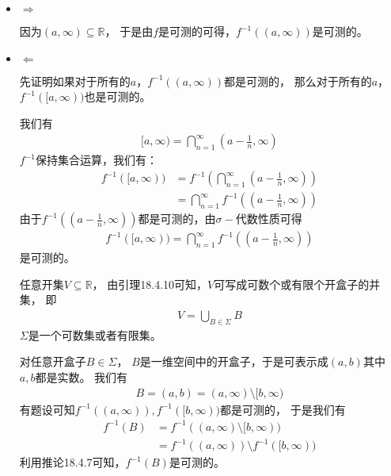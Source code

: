 \documentclass{article}
\begin{document}
\begin{itemize}
  \item $\Rightarrow$

        因为$(a, \infty) \subseteq \mathbb{R}$，
        于是由$f$是可测的可得，$f^{-1}((a, \infty))$是可测的。

  \item $\Leftarrow$

        先证明如果对于所有的$a$，$f^{-1}((a, \infty))$都是可测的，
        那么对于所有的$a$，$f^{-1}([a, \infty))$也是可测的。

        我们有
        \begin{align*}
          [a, \infty) = \bigcap\limits_{n = 1}^\infty (a - \frac{1}{n}, \infty)
        \end{align*}
        $f^{-1}$保持集合运算，我们有：
        \begin{align*}
          f^{-1}([a, \infty)) & = f^{-1}\left(\bigcap\limits_{n = 1}^\infty (a - \frac{1}{n}, \infty)\right) \\
                              & = \bigcap\limits_{n = 1}^\infty f^{-1}((a - \frac{1}{n}, \infty))
        \end{align*}
        由于$f^{-1}((a - \frac{1}{n}, \infty))$都是可测的，由$\sigma-$代数性质可得
        \begin{align*}
          f^{-1}([a, \infty)) = \bigcap\limits_{n = 1}^\infty f^{-1}((a - \frac{1}{n}, \infty))
        \end{align*}
        是可测的。

        任意开集$V \subseteq \mathbb{R}$，
        由引理18.4.10可知，$V$可写成可数个或有限个开盒子的并集，
        即
        \begin{align*}
          V = \bigcup_{B \in \Sigma} B
        \end{align*}
        $\Sigma$是一个可数集或者有限集。

        对任意开盒子$B \in \Sigma$，
        $B$是一维空间中的开盒子，于是可表示成$(a, b)$其中$a, b$都是实数。
        我们有
        \begin{align*}
          B = (a, b) = (a, \infty) \setminus [b, \infty)
        \end{align*}
        有题设可知$f^{-1}((a, \infty)), f^{-1}([b, \infty))$都是可测的，
        于是我们有
        \begin{align*}
          f^{-1}(B) & = f^{-1}((a, \infty) \setminus [b, \infty))         \\
                    & = f^{-1}((a, \infty)) \setminus f^{-1}([b, \infty))
        \end{align*}
        利用推论18.4.7可知，$f^{-1}(B)$是可测的。 
\end{itemize}
\end{document}
